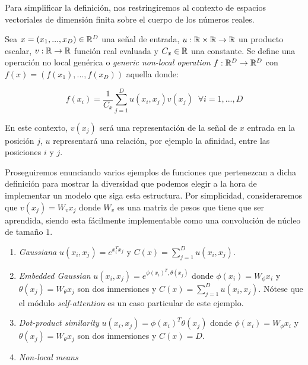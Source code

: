 Para simplificar la definición, nos restringiremos al contexto de espacios vectoriales de dimensión finita sobre el cuerpo de los números reales.
\begin{definicion}
 Sea $x=(x_1,...,x_D)\in \mathbb{R}^D$ una señal de entrada, $u:\mathbb{R} \times \mathbb{R} \to \mathbb{R}$ un producto escalar, $v:\mathbb{R} \to \mathbb{R}$ función real evaluada y $C_x\in \mathbb{R}$ una constante.  Se define una operación no local genérica o \emph{generic non-local operation} $f:\mathbb{R}^D \to \mathbb{R}^D$ con $f(x)=(f(x_1),...,f(x_D))$ aquella donde:

 $$f(x_i)=\frac{1}{C_x}\sum_{j=1}^{D} u(x_i,x_j)v(x_j) \; \;  \forall i=1,...,D$$
\end{definicion}

 En este contexto, $v(x_j)$ será una representación de la señal de $x$ entrada en la posición $j$, $u$ representará una relación, por ejemplo la afinidad, entre las posiciones $i$ y $j$. %
\newline

 Proseguiremos enunciando varios ejemplos de funciones que pertenezcan a dicha definición para mostrar la diversidad que podemos elegir a la hora de implementar un modelo que siga esta estructura. Por simplicidad, consideraremos que $v(x_j)=W_v x_j$ donde $W_v$ es una matriz de pesos que tiene que ser aprendida, siendo esta fácilmente implementable como una convolución de núcleo de tamaño $1$.

 \begin{enumerate}
 \item \emph{Gaussiana} $u(x_i,x_j)=e^{x_i^T x_j}$ y $C(x)= \sum_{j=1}^D u(x_i,x_j)$.
 \item \emph{Embedded Gaussian} $u(x_i,x_j)=e^{\phi(x_i)^T,\theta(x_j)}$ donde $\phi(x_i)=W_\phi x_i$ y $\theta(x_j)=W_\theta x_j$ son dos inmersiones y  $C(x)= \sum_{j=1}^D u(x_i,x_j)$. Nótese que el módulo \emph{self-attention} es un caso particular de este ejemplo.
 \item \emph{Dot-product similarity} $u(x_i,x_j)=\phi(x_i)^T \theta(x_j)$ donde $\phi(x_i)=W_\phi x_i$ y $\theta(x_j)=W_\theta x_j$ son dos inmersiones y $C(x)=D$.
 \item \emph{Non-local means} \cite{Buades:2005:NAI:1068508.1069066}
 \end{enumerate}

